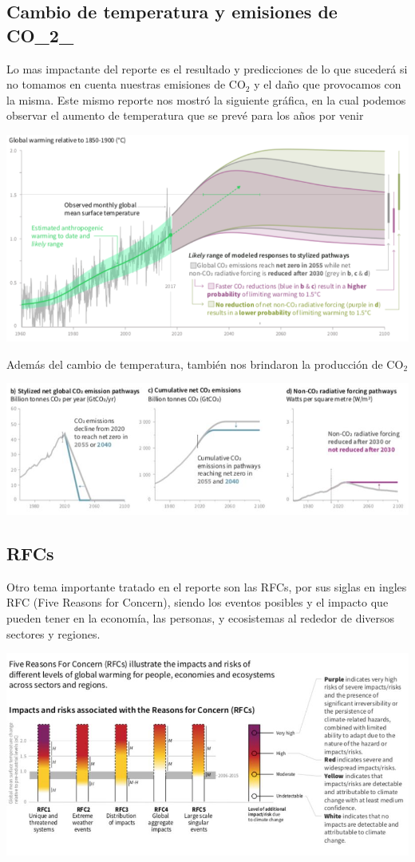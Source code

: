\documentclass[6pt, spanish]{report}
\begin{document}
\subsection*{Cambio de temperatura y emisiones de CO_{2}_}
Lo mas impactante del reporte es el resultado y predicciones de lo que sucederá si no tomamos en cuenta nuestras emisiones de CO$_{2}$ y el daño que provocamos con la misma. 
Este mismo reporte nos mostró la siguiente gráfica, en la cual podemos observar el aumento de temperatura que se prevé para los años por venir

\begin{center}\vspace{.2cm}
\includegraphics[width=.2\linewidth]{Graficas2.png}
\end{center}\vspace{.2cm}


Además del cambio de temperatura, también nos brindaron la producción de CO$_{2}$  

\begin{center}\vspace{.2cm}
\includegraphics[width=.2\linewidth]{Grafica3.jpg}
\end{center}\vspace{.2cm}


\subsection*{RFCs}
Otro tema importante tratado en el reporte son las RFCs, por sus siglas en ingles RFC (Five Reasons for Concern), siendo los eventos posibles y el impacto que pueden tener en la economía, las personas, y ecosistemas al rededor de diversos sectores y regiones.

\begin{center}\vspace{.2cm}
\includegraphics[width=.2\linewidth]{Grafica4.jpg}
\end{center}\vspace{.2cm}
 
\end{document}
